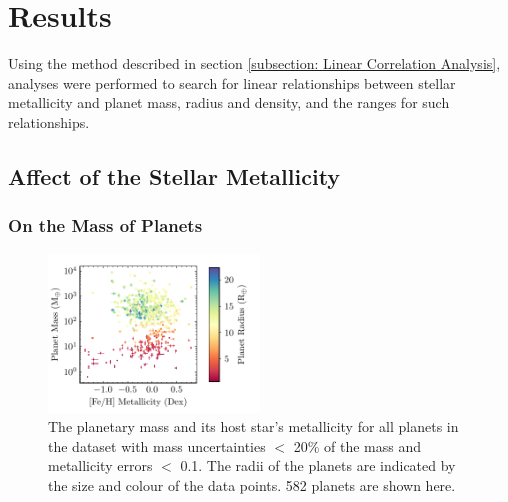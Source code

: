 \documentclass[a4paper,twocolumn,12pt]{article}
\begin{document}

\section{Results}

Using the method described in section \ref{subsection: Linear Correlation Analysis}, analyses were performed to search for linear relationships between stellar metallicity and planet mass, radius and density, and the ranges for such relationships.


\subsection{Affect of the Stellar Metallicity}


\subsubsection{On the Mass of Planets}

\begin{figure}[h!]
    \centering
    \includegraphics[width=0.5\textwidth]{Graphs/FeH vs Mass Planet Plot.pdf}
    \caption{The planetary mass and its host star's metallicity for all planets in the dataset with mass uncertainties $<$ 20\% of the mass and metallicity errors $<$ 0.1. The radii of the planets are indicated by the size and colour of the data points. 582 planets are shown here.}
    \label{figure: Fe/H vs Mass parameter plot}
\end{figure}
\end{document}
